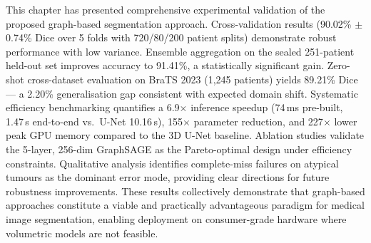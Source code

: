 This chapter has presented comprehensive experimental validation of the proposed graph-based segmentation approach. Cross-validation results (90.02\% $\pm$ 0.74\% Dice over 5 folds with 720/80/200 patient splits) demonstrate robust performance with low variance. Ensemble aggregation on the sealed 251-patient held-out set improves accuracy to 91.41\%, a statistically significant gain. Zero-shot cross-dataset evaluation on BraTS 2023 (1,245 patients) yields 89.21\% Dice — a 2.20\% generalisation gap consistent with expected domain shift. Systematic efficiency benchmarking quantifies a 6.9$\times$ inference speedup (74\,ms pre-built, 1.47\,s end-to-end vs.\ U-Net 10.16\,s), 155$\times$ parameter reduction, and 227$\times$ lower peak GPU memory compared to the 3D U-Net baseline. Ablation studies validate the 5-layer, 256-dim GraphSAGE as the Pareto-optimal design under efficiency constraints. Qualitative analysis identifies complete-miss failures on atypical tumours as the dominant error mode, providing clear directions for future robustness improvements. These results collectively demonstrate that graph-based approaches constitute a viable and practically advantageous paradigm for medical image segmentation, enabling deployment on consumer-grade hardware where volumetric models are not feasible.

\clearpage